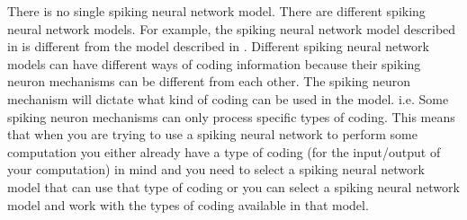 \documentclass[12pt,A4]{article}
\begin{document}
There is no single spiking neural network model. There are different spiking neural network models.
For example, the spiking neural network model described in \cite{maass-1997-third} is different from
the model described in \cite{ghosh-dastidar-2009-snn}. Different spiking neural network models 
can have different ways of coding information because their spiking neuron mechanisms can be 
different from each other. The spiking neuron mechanism will dictate what kind of coding can be 
used in the model. i.e. Some spiking neuron mechanisms can only process specific types of coding.
This means that when you are trying to use a spiking neural network to perform some computation 
you either already have a type of coding (for the input/output of your computation) in mind and you 
need to select a spiking neural network model that can use that type of coding or you can select
a spiking neural network model and work with the types of coding available in that model. 




\end{document}
